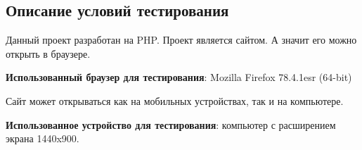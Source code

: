 \subsection{Описание условий тестирования}

Данный проект разработан на PHP. Проект является сайтом. А значит его можно открыть в браузере.

\textbf{Использованный браузер для тестирования}: Mozilla Firefox 78.4.1esr (64-bit)

Сайт может открываться как на мобильных устройствах, так и на компьютере.

\textbf{Использованное устройство для тестирования}: компьютер с расширением экрана 1440x900.